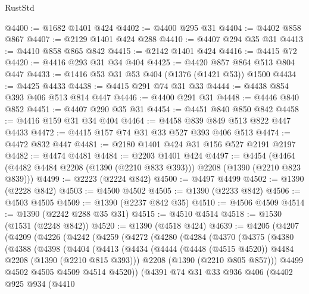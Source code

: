 \begin{lexlean}{RustStd}
\begin{coremodule}
@4400 := @1682 @1401 @424
@4402 := @4400 @295 @31
@4404 := @4402 @858 @867
@4407 := @2129 @1401 @424 @288
@4410 := @4407 @294 @35 @31
@4413 := @4410 @858 @865 @842
@4415 := @2142 @1401 @424
@4416 := @4415 @72
@4420 := @4416 @293 @31 @34 @404
@4425 := @4420 @857 @864 @513 @804 @447
@4433 := @1416 @53 @31 @53 @404 (@1376 (@1421 @53)) @1500
@4434 := @4425 @4433
@4438 := @4415 @291 @74 @31 @33
@4444 := @4438 @854 @393 @406 @513 @814 @447
@4446 := @4400 @291 @31
@4448 := @4446 @840 @852
@4451 := @4407 @290 @35 @31
@4454 := @4451 @840 @850 @842
@4458 := @4416 @159 @31 @34 @404
@4464 := @4458 @839 @849 @513 @822 @447 @4433
@4472 := @4415 @157 @74 @31 @33 @527 @393 @406 @513
@4474 := @4472 @832 @447
@4481 := @2180 @1401 @424 @31 @156 @527 @2191 @2197
@4482 := @4474 @4481
@4484 := @2203 @1401 @424
@4497 := @4454 (@4464 (@4482 @4484 @2208 (@1390 (@2210 @833 @393))) @2208 (@1390 (@2210 @823 @839)))
@4499 := @2223 (@2224 @842)
@4500 := @4497 @4499
@4502 := @1390 (@2228 @842)
@4503 := @4500 @4502
@4505 := @1390 (@2233 @842)
@4506 := @4503 @4505
@4509 := @1390 (@2237 @842 @35)
@4510 := @4506 @4509
@4514 := @1390 (@2242 @288 @35 @31)
@4515 := @4510 @4514
@4518 := @1530 (@1531 (@2248 @842))
@4520 := @1390 (@4518 @424)
@4639 := @4205
    (@4207
      (@4209
        (@4226
          (@4242
            (@4259
              (@4272
                (@4280
                  (@4284
                    (@4370
                      (@4375
                        (@4380
                          (@4388
                            (@4398
                              (@4404
                                (@4413
                                  (@4434
                                    (@4444
                                      (@4448 (@4515 @4520))
                                      @4484
                                      @2208
                                      (@1390 (@2210 @815 @393)))
                                    @2208
                                    (@1390 (@2210 @805 @857)))
                                  @4499
                                  @4502
                                  @4505
                                  @4509
                                  @4514
                                  @4520))
                              (@4391
                                @74
                                @31
                                @33
                                @936
                                @406
                                (@4402
                                  @925
                                  @934
                                  (@4410

\end{coremodule}
\end{lexlean}
